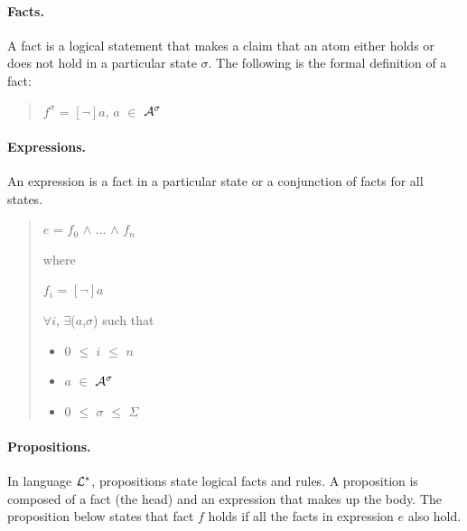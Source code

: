 \documentclass[10pt, twocolumn]{article}
\begin{document}
        \paragraph{Facts.}
       
          A fact is a logical statement that makes a claim that an atom either
          holds or does not hold in a particular state $\sigma$. The following
          is the formal definition of a fact:

          \begin{quote}
            $f^{\sigma}$ = $[\lnot]$$a$, $a$ $\in$ ${\cal A}^{\sigma}$
          \end{quote}

        \paragraph{Expressions.}

          An expression is a fact in a particular state or a conjunction of
          facts for all states.

          \begin{quote}
            $e$ = $f_{0}$ $\land$ ... $\land$ $f_{n}$

            where

            $f_{i}$ = $[\lnot]$$a$

            $\forall$$i$, $\exists$($a$,$\sigma$)
            such that

            \begin{itemize}
              \item
                $0$ $\leq$ $i$ $\leq$ $n$
              \item
                $a$ $\in$ ${\cal A}^{\sigma}$
              \item
                $0$ $\leq$ $\sigma$ $\leq$ $\Sigma$
            \end{itemize}
          \end{quote}

        \paragraph{Propositions.}

          In language ${\cal L}^{*}$, propositions state logical facts and
          rules. A proposition is composed of a fact (the head) and an
          expression that makes up the body. The proposition below states that
          fact $f$ holds if all the facts in expression $e$ also hold.
\end{document}
